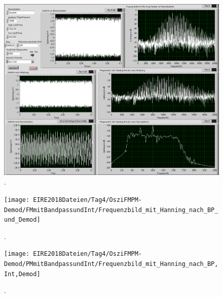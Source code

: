 \documentclass[
a4paper,
12pt,
pagesize,
ngerman
]{scrartcl}
\begin{document}
	\begin{figure}[H]
		\centering
		\includegraphics[width=1.0\textwidth]{EIRE2018Dateien/Tag4/OsziFMPM-Demod/mitBandpassUndIntegrationBilder/OsziPlusFMPMp}
		\caption{.}
	\end{figure}
	
	\begin{figure}[H] %
		\centering
		\texttt{[image: EIRE2018Dateien/Tag4/OsziFMPM-Demod/FMmitBandpassundInt/Frequenzbild\_mit\_Hanning\_nach\_BP\_und\_Demod]}
		\caption{.}
	\end{figure}
	
	\begin{figure}[H] %
		\centering
		\texttt{[image: EIRE2018Dateien/Tag4/OsziFMPM-Demod/PMmitBandpassundInt/Frequenzbild\_mit\_Hanning\_nach\_BP,Int,Demod]}
		\caption{.}
	\end{figure}
	
	
	\printbibliography %
	
	
\end{document}
